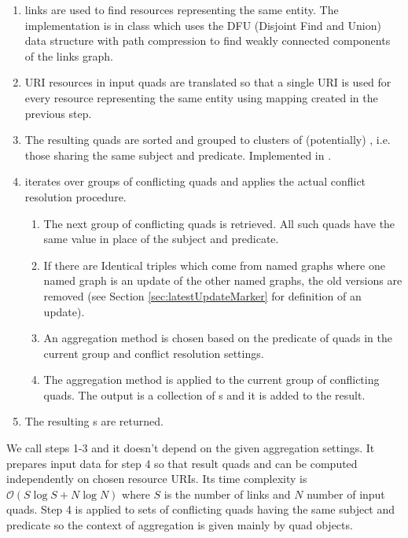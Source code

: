 \begin{enumerate}
	\item {} links are used to find resources representing the same entity. The implementation is in class  which uses the DFU (Disjoint Find and Union) data structure with path compression to find weakly connected components of the  links graph.
	\item URI resources in input quads are translated so that a single URI is used for every resource representing the same entity using mapping created in the previous step.
	\item The resulting quads are sorted and grouped to clusters of (potentially) , i.e. those sharing the same subject and predicate. Implemented in .
	\item \CR iterates over groups of conflicting quads and applies the actual conflict resolution procedure.
		\begin{enumerate}
			\item The next group of conflicting quads is retrieved. All such quads have the same value in place of the subject and predicate.
			\item If there are Identical triples which come from named graphs where one named graph is an update of the other named graphs, the old versions are removed (see Section \ref{sec:latestUpdateMarker} for definition of an update).
			\item An aggregation method is chosen based on the predicate of quads in the current group and conflict resolution settings.
			\item \label{item:crAggr}
				The aggregation method is applied to the current group of conflicting quads. The output is a collection of s and it is added to the result.
		\end{enumerate}
	\item The resulting s are returned.
\end{enumerate}

We call steps 1-3  and it doesn't depend on the given aggregation settings. It prepares input data for step 4 so that result quads and \aggrq can be computed independently on chosen resource URIs. Its time complexity is $\mathcal{O}(S \log S + N \log N)$ where $S$ is the number of  links and $N$ number of input quads. Step 4 is applied to sets of conflicting quads having the same subject and predicate so the context of aggregation is given mainly by quad objects.

